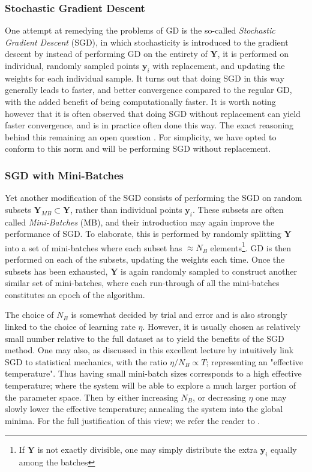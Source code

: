 \documentclass[reprint, english, nofootinbib]{revtex4-2}
\begin{document}
\subsubsection{Stochastic Gradient Descent}
\noindent
One attempt at remedying the problems of GD is the so-called \textit{Stochastic Gradient Descent} (SGD), in which stochasticity is introduced to the gradient descent by instead of performing GD on the entirety of $\pmb Y$, it is performed on individual, randomly sampled points $\pmb y_i$ with replacement, and updating the weights for each individual sample.
It turns out that doing SGD in this way generally leads to faster, and better convergence compared to the regular GD, with the added benefit of being computationally faster. It is worth noting however that it is often observed that doing SGD without replacement can yield faster convergence, and is in practice often done this way. The exact reasoning behind this remaining an open question \cite{shamir2016withoutreplacement}\cite{pmlr-v97-nagaraj19a}. For simplicity, we have opted to conform to this norm and will be performing SGD without replacement.

\subsubsection{SGD with Mini-Batches\label{sect: SGD with mini-batches}}
\noindent
Yet another modification of the SGD consists of performing the SGD on random subsets $\pmb Y_{MB} \subset \pmb Y$, rather than individual points $\pmb y_i$. These subsets are often called \textit{Mini-Batches} (MB), and their introduction may again improve the performance of SGD. To elaborate, this is performed by randomly splitting $\pmb Y$ into a set of mini-batches where each subset has $\approx N_{B}$ elements\footnote{If $\pmb Y$ is not exactly divisible, one may simply distribute the extra $\pmb y_i$ equally among the batches}. GD is then performed on each of the subsets, updating the weights each time. Once the subsets has been exhausted, $\pmb Y$ is again randomly sampled to construct another similar set of mini-batches, where each run-through of all the mini-batches constitutes an epoch of the algorithm.

The choice of $N_{B}$ is somewhat decided by trial and error and is also strongly linked to the choice of learning rate $\eta$. However, it is usually chosen as relatively small number relative to the full dataset as to yield the benefits of the SGD method. One may also, as discussed in this excellent lecture by \textcite{ManyBodyML} intuitively link SGD to statistical mechanics, with the ratio $\eta / N_{B} \propto T$; representing an "effective temperature". Thus having small mini-batch sizes corresponds to a high effective temperature; where the system will be able to explore a much larger portion of the parameter space. Then by either increasing $N_B$, or decreasing $\eta$ one may slowly lower the effective temperature; annealing the system into the global minima. For the full justification of this view; we refer the reader to \textcite{ManyBodyML}.
\end{document}
